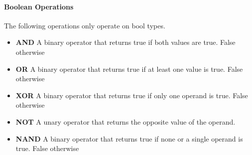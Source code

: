 \paragraph{Boolean Operations}
\label{sec:boolOps}

The following operations only operate on bool types.

\begin{itemize}
  \item \textbf{AND} A binary operator that returns true if both values are true. False otherwise
  \item \textbf{OR} A binary operator that returns true if at least one value is true. False otherwise
  \item \textbf{XOR} A binary operator that returns true if only one operand is true. False otherwise
  \item \textbf{NOT} A unary operator that returns the opposite value of the operand.
  \item \textbf{NAND} A binary operator that returns true if none or a single operand is true. False otherwise
\end{itemize}
